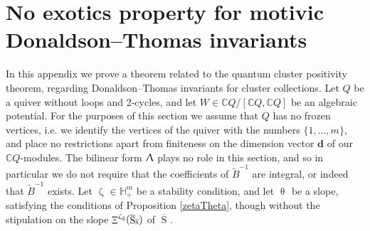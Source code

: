 \documentclass[a4paper,10pt]{amsart}
\newcommand{\dd}{\mathbf{d}}
\DeclareMathOperator{\Simp}{S}
\newcommand{\shave}{\overline{\Simp}_{\Ss}}
\renewcommand{\theta}{\uptheta}
\renewcommand{\zeta}{\upzeta}
\renewcommand{\Lambda}{\Uplambda}
\DeclareMathOperator{\Mu}{\Upxi}
\DeclareMathOperator{\Ss}{\overline{s}}
\begin{document}
\section{No exotics property for motivic Donaldson--Thomas invariants}
In this appendix we prove a theorem related to the quantum cluster positivity theorem, regarding Donaldson--Thomas invariants for cluster collections.  Let $Q$ be a quiver without loops and 2-cycles, and let $W\in\mathbb{C}Q/[\mathbb{C}Q,\mathbb{C}Q]$ be an algebraic potential.  For the purposes of this section we assume that $Q$ has no frozen vertices, i.e. we identify the vertices of the quiver with the numbers $\{1,\ldots,m\}$, and place no restrictions apart from finiteness on the dimension vector $\dd$ of our $\mathbb{C}Q$-modules.  The bilinear form $\Lambda$ plays no role in this section, and so in particular we do not require that the coefficients of $\tilde{B}^{-1}$ are integral, or indeed that $\tilde{B}^{-1}$ exists.  Let $\zeta_{\Ss}\in\mathbb{H}_+^m$ be a stability condition, and let $\theta_{\Ss}$ be a slope, satisfying the conditions of Proposition \ref{zetaTheta}, though without the stipulation on the slope $\Mu^{\zeta_{\Ss}}(\shave)$ of $\shave$.
\end{document}
